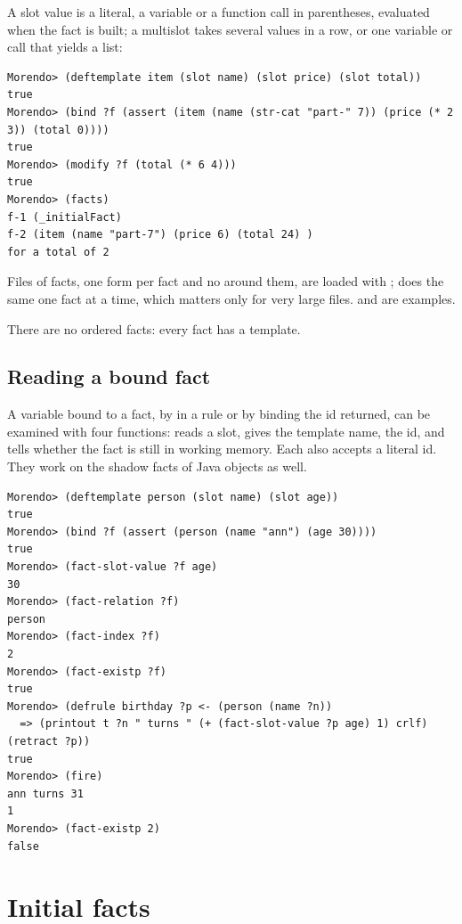 A slot value is a literal, a variable or a function call in parentheses,
evaluated when the fact is built; a multislot takes several values in a
row, or one variable or call that yields a list:

\begin{lstlisting}[style=shell]
Morendo> (deftemplate item (slot name) (slot price) (slot total))
true
Morendo> (bind ?f (assert (item (name (str-cat "part-" 7)) (price (* 2 3)) (total 0))))
true
Morendo> (modify ?f (total (* 6 4)))
true
Morendo> (facts)
f-1 (_initialFact)
f-2 (item (name "part-7") (price 6) (total 24) )
for a total of 2
\end{lstlisting}

Files of facts, one  form per fact and
no  around them, are loaded with ;
 does the same one fact at a time, which matters only for
very large files.  and
 are examples.

There are no ordered facts: every fact has a template.

\subsection{Reading a bound fact}
\label{sec:fact-access}

A variable bound to a fact, by  in a rule or by binding
the id  returned, can be examined with four functions:
 reads a slot,  gives the
template name,  the id, and  tells
whether the fact is still in working memory. Each also accepts a
literal id. They work on the shadow facts of Java objects as well.

\begin{lstlisting}[style=shell]
Morendo> (deftemplate person (slot name) (slot age))
true
Morendo> (bind ?f (assert (person (name "ann") (age 30))))
true
Morendo> (fact-slot-value ?f age)
30
Morendo> (fact-relation ?f)
person
Morendo> (fact-index ?f)
2
Morendo> (fact-existp ?f)
true
Morendo> (defrule birthday ?p <- (person (name ?n))
  => (printout t ?n " turns " (+ (fact-slot-value ?p age) 1) crlf) (retract ?p))
true
Morendo> (fire)
ann turns 31
1
Morendo> (fact-existp 2)
false
\end{lstlisting}

\section{Initial facts}
\label{sec:deffacts}

